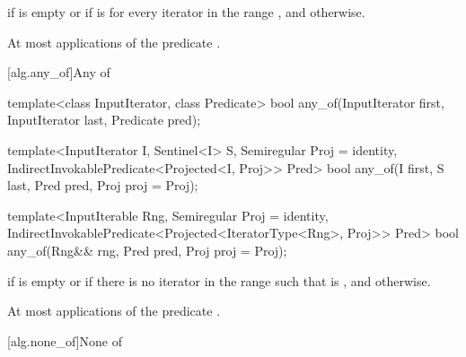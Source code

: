 \begin{itemdescr}
\pnum
\returns {} if
 is empty or if
is  for every iterator  in the range ,
and  otherwise.

\pnum
\complexity At most  applications of the predicate
.
\end{itemdescr}

[alg.any_of]{Any of}

%
\begin{removedblock}
\begin{itemdecl}
template<class InputIterator, class Predicate>
  bool any_of(InputIterator first, InputIterator last, Predicate pred);
\end{itemdecl}
\end{removedblock}
\begin{addedblock}
\begin{itemdecl}
template<InputIterator I, Sentinel<I> S, Semiregular Proj = identity,
    IndirectInvokablePredicate<Projected<I, Proj>> Pred>
  bool any_of(I first, S last, Pred pred, Proj proj = Proj{});

template<InputIterable Rng, Semiregular Proj = identity,
    IndirectInvokablePredicate<Projected<IteratorType<Rng>, Proj>> Pred>
  bool any_of(Rng&& rng, Pred pred, Proj proj = Proj{});
\end{itemdecl}
\end{addedblock}

\begin{itemdescr}
\pnum
\returns {} if  is empty or
if there is no iterator  in the range
 such that
is , and  otherwise.

\pnum
\complexity At most  applications of the predicate
.
\end{itemdescr}

[alg.none_of]{None of}

